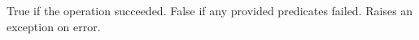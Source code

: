 True if the operation succeeded.  False if any provided predicates failed.
Raises an exception on error.
